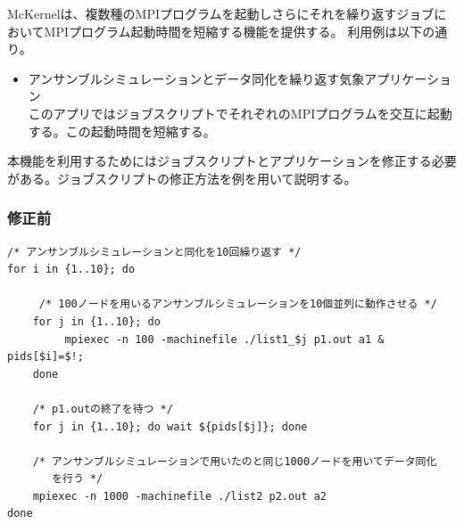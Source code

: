 \documentclass[twoside,11pt,fleqn]{book}
\begin{document}

McKernelは、複数種のMPIプログラムを起動しさらにそれを繰り返すジョブにおいてMPIプログラム起動時間を短縮する機能を提供する。
利用例は以下の通り。
\begin{itemize}
\item アンサンブルシミュレーションとデータ同化を繰り返す気象アプリケーション\\
このアプリではジョブスクリプトでそれぞれのMPIプログラムを交互に起動する。この起動時間を短縮する。
\end{itemize}

本機能を利用するためにはジョブスクリプトとアプリケーションを修正する必要がある。ジョブスクリプトの修正方法を例を用いて説明する。
\subsubsection*{修正前}
\small
\begin{verbatim}
/* アンサンブルシミュレーションと同化を10回繰り返す */
for i in {1..10}; do

     /* 100ノードを用いるアンサンブルシミュレーションを10個並列に動作させる */
    for j in {1..10}; do
         mpiexec -n 100 -machinefile ./list1_$j p1.out a1 & pids[$i]=$!;
    done

    /* p1.outの終了を待つ */
    for j in {1..10}; do wait ${pids[$j]}; done

    /* アンサンブルシミュレーションで用いたのと同じ1000ノードを用いてデータ同化
       を行う */
    mpiexec -n 1000 -machinefile ./list2 p2.out a2
done
\end{verbatim}
\normalsize
\end{document}
